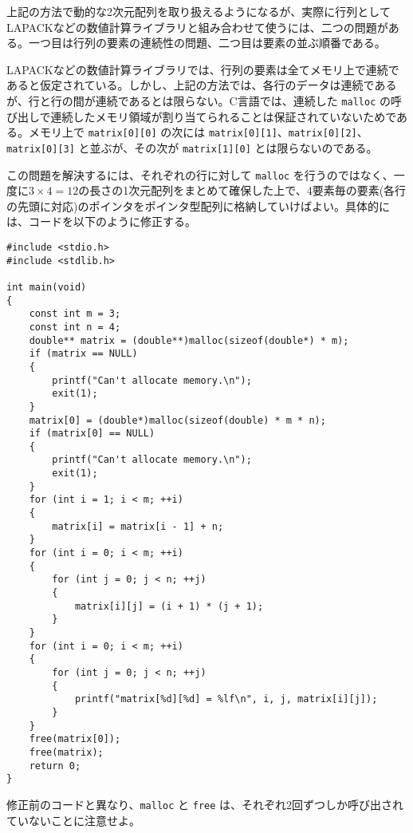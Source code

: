 上記の方法で動的な2次元配列を取り扱えるようになるが、実際に行列としてLAPACKなどの数値計算ライブラリと組み合わせて使うには、二つの問題がある。一つ目は行列の要素の連続性の問題、二つ目は要素の並ぶ順番である。

LAPACKなどの数値計算ライブラリでは、行列の要素は全てメモリ上で連続であると仮定されている。しかし、上記の方法では、各行のデータは連続であるが、行と行の間が連続であるとは限らない。C言語では、連続した \texttt{malloc} の呼び出しで連続したメモリ領域が割り当てられることは保証されていないためである。メモリ上で \texttt{matrix[0][0]} の次には \texttt{matrix[0][1]}、\texttt{matrix[0][2]}、\texttt{matrix[0][3]} と並ぶが、その次が \texttt{matrix[1][0]} とは限らないのである。

この問題を解決するには、それぞれの行に対して \texttt{malloc} を行うのではなく、一度に\(3 \times 4 = 12\)の長さの1次元配列をまとめて確保した上で、4要素毎の要素(各行の先頭に対応)のポインタをポインタ型配列に格納していけばよい。具体的には、コードを以下のように修正する。
\begin{reidai}\label{ex:malloc-2dim-continuous}
    \begin{verbatim}
#include <stdio.h>
#include <stdlib.h>

int main(void)
{
    const int m = 3;
    const int n = 4;
    double** matrix = (double**)malloc(sizeof(double*) * m);
    if (matrix == NULL)
    {
        printf("Can't allocate memory.\n");
        exit(1);
    }
    matrix[0] = (double*)malloc(sizeof(double) * m * n);
    if (matrix[0] == NULL)
    {
        printf("Can't allocate memory.\n");
        exit(1);
    }
    for (int i = 1; i < m; ++i)
    {
        matrix[i] = matrix[i - 1] + n;
    }
    for (int i = 0; i < m; ++i)
    {
        for (int j = 0; j < n; ++j)
        {
            matrix[i][j] = (i + 1) * (j + 1);
        }
    }
    for (int i = 0; i < m; ++i)
    {
        for (int j = 0; j < n; ++j)
        {
            printf("matrix[%d][%d] = %lf\n", i, j, matrix[i][j]);
        }
    }
    free(matrix[0]);
    free(matrix);
    return 0;
}
\end{verbatim}
\end{reidai} \noindent
修正前のコードと異なり、\texttt{malloc} と \texttt{free} は、それぞれ2回ずつしか呼び出されていないことに注意せよ。

